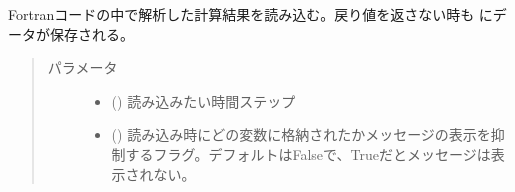 \documentclass[letterpaper,10pt,dvipdfmx,report]{sphinxmanual}
\begin{document}
\begin{fulllineitems}
\label{\detokenize{io:R2D2.R2D2_data.read_vc}}
Fortranコードの中で解析した計算結果を読み込む。戻り値を返さない時も {\hyperref[\detokenize{io:R2D2.R2D2_data.vc}]{}} にデータが保存される。
\begin{quote}\begin{description}
\item[{パラメータ}] \leavevmode\begin{itemize}
\item {} 
 () \sphinxhyphen{}\sphinxhyphen{} 読み込みたい時間ステップ

\item {} 
 () \sphinxhyphen{}\sphinxhyphen{} 読み込み時にどの変数に格納されたかメッセージの表示を抑制するフラグ。デフォルトはFalseで、Trueだとメッセージは表示されない。

\end{itemize}

\end{description}\end{quote}

\end{fulllineitems}

\end{document}
